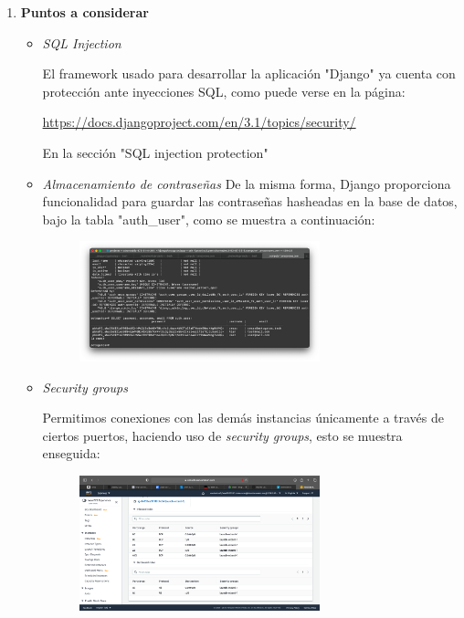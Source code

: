 \documentclass{article}
\begin{document}
\begin{enumerate}
    \item {\bf Puntos a considerar}

    \begin{itemize}
        \item {\it SQL Injection}

        El framework usado para desarrollar la aplicación "Django" ya cuenta con
        protección ante inyecciones SQL, como puede verse en la página:

        \begin{center}
            \url{https://docs.djangoproject.com/en/3.1/topics/security/}
        \end{center}

        En la sección "SQL injection protection"

        \item {\it Almacenamiento de contraseñas}
        De la misma forma, Django proporciona funcionalidad para guardar las
        contraseñas hasheadas en la base de datos, bajo la tabla "auth\_user",
        como se muestra a continuación:

        \begin{figure}[H]
            \centering
            \includegraphics[width=0.70\textwidth]{AppServer/r4}
        \end{figure}

        \item {\it Security groups}

        Permitimos conexiones con las demás instancias únicamente a través de
        ciertos puertos, haciendo uso de {\it security groups}, esto se muestra
        enseguida:

        \begin{figure}[H]
            \centering
            \includegraphics[width=0.70\textwidth]{AppServer/r5}
        \end{figure}


\end{itemize}
\end{enumerate}
\end{document}
